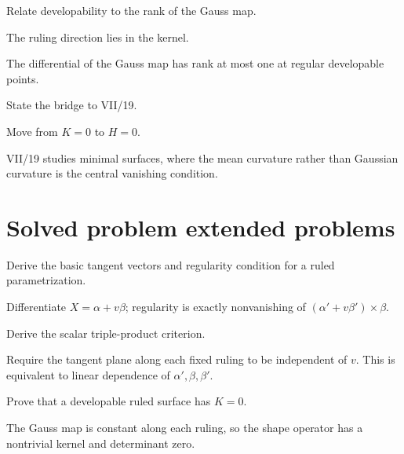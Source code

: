 \begin{exercise}\label{exr:vii18-23}
Relate developability to the rank of the Gauss map.
\end{exercise}
\begin{hint}
The ruling direction lies in the kernel.
\end{hint}
\begin{solution}
The differential of the Gauss map has rank at most one at regular developable points.
\end{solution}

\begin{exercise}\label{exr:vii18-24}
State the bridge to VII/19.
\end{exercise}
\begin{hint}
Move from \(K=0\) to \(H=0\).
\end{hint}
\begin{solution}
VII/19 studies minimal surfaces, where the mean curvature rather than Gaussian curvature is the central vanishing condition.
\end{solution}

\section{Solved problem extended problems}
\begin{problem}\label{prob:vii18-01}
Derive the basic tangent vectors and regularity condition for a ruled parametrization.
\end{problem}
\begin{solution}
Differentiate \(X=\alpha+v\beta\); regularity is exactly nonvanishing of \((\alpha'+v\beta')\times\beta\).
\end{solution}

\begin{problem}\label{prob:vii18-02}
Derive the scalar triple-product criterion.
\end{problem}
\begin{solution}
Require the tangent plane along each fixed ruling to be independent of \(v\). This is equivalent to linear dependence of \(\alpha',\beta,\beta'\).
\end{solution}

\begin{problem}\label{prob:vii18-03}
Prove that a developable ruled surface has \(K=0\).
\end{problem}
\begin{solution}
The Gauss map is constant along each ruling, so the shape operator has a nontrivial kernel and determinant zero.
\end{solution}

